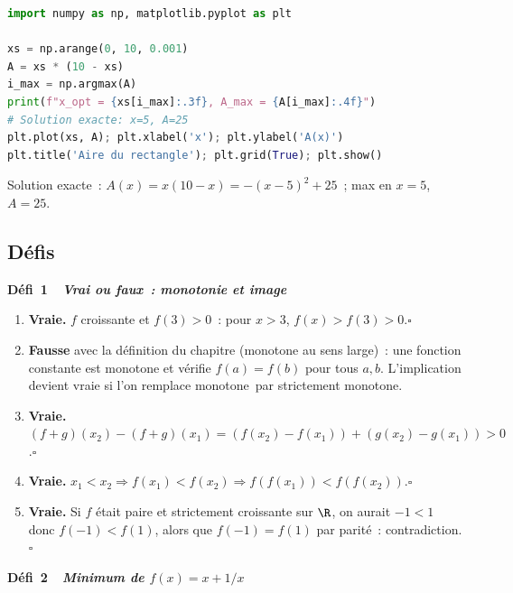 
\begin{lstlisting}[language=Python]
import numpy as np, matplotlib.pyplot as plt

xs = np.arange(0, 10, 0.001)
A = xs * (10 - xs)
i_max = np.argmax(A)
print(f"x_opt = {xs[i_max]:.3f}, A_max = {A[i_max]:.4f}")
# Solution exacte: x=5, A=25
plt.plot(xs, A); plt.xlabel('x'); plt.ylabel('A(x)')
plt.title('Aire du rectangle'); plt.grid(True); plt.show()
\end{lstlisting}
Solution exacte~: $A(x)=x(10-x)=-(x-5)^2+25$~; max en $x=5$, $A=25$.

\subsection*{D\'efis}

\noindent{}
{\color{BO}\bfseries\small D\'efi~1~\textendash\ \textit{Vrai ou faux~: monotonie et image}}
\par\smallskip

\begin{enumerate}
  \item \textbf{Vraie.} $f$ croissante et $f(3)>0$~: pour $x>3$, $f(x)>f(3)>0$.\hfill$\square$
  \item \textbf{Fausse} avec la d\'efinition du chapitre (monotone au sens large)~: une fonction constante est monotone et v\'erifie $f(a)=f(b)$ pour tous $a,b$. L'implication devient vraie si l'on remplace \og monotone\fg\ par \og strictement monotone\fg.
  \item \textbf{Vraie.} $(f+g)(x_2)-(f+g)(x_1)=(f(x_2)-f(x_1))+(g(x_2)-g(x_1))>0$.\hfill$\square$
  \item \textbf{Vraie.} $x_1<x_2\Rightarrow f(x_1)<f(x_2)\Rightarrow f(f(x_1))<f(f(x_2))$.\hfill$\square$
  \item \textbf{Vraie.} Si $f$ \'etait paire et strictement croissante sur $\R$, on aurait $-1<1$ donc $f(-1)<f(1)$,
        alors que $f(-1)=f(1)$ par parit\'e~: contradiction.\hfill$\square$
\end{enumerate}

\noindent{}
{\color{BO}\bfseries\small D\'efi~2~\textendash\ \textit{Minimum de $f(x)=x+1/x$}}
\par\smallskip

